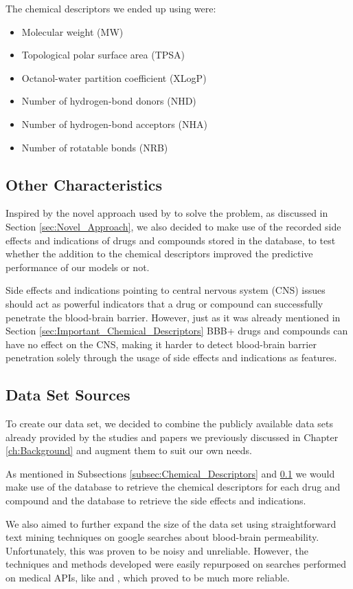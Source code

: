 The chemical descriptors we ended up using were:

\begin{itemize}
    \item
    Molecular weight (MW)
    \item
    Topological polar surface area (TPSA)
    \item
    Octanol-water partition coefficient (XLogP)
    \item
    Number of hydrogen-bond donors (NHD)
    \item
    Number of hydrogen-bond acceptors (NHA)
    \item
   Number of rotatable bonds (NRB)
\end{itemize}

\subsection{Other Characteristics}
\label{subsec:Other_Characteristics}

Inspired by the novel approach used by \citet{Gao2017} to solve the problem, as discussed in Section \ref{sec:Novel_Approach}, we also decided to make use of the recorded side effects and indications of drugs and compounds stored in the \citet{SIDER} database, to test whether the addition to the chemical descriptors improved the predictive performance of our models or not.

Side effects and indications pointing to central nervous system (CNS) issues should act as powerful indicators that a drug or compound can successfully penetrate the blood-brain barrier. However, just as it was already mentioned in Section \ref{sec:Important_Chemical_Descriptors} BBB+ drugs and compounds can have no effect on the CNS, making it harder to detect blood-brain barrier penetration solely through the usage of side effects and indications as features. 

\subsection{Data Set Sources}

To create our data set, we decided to combine the publicly available data sets already provided by the studies and papers we previously discussed in Chapter \ref{ch:Background} and augment them to suit our own needs. 

As mentioned in Subsections \ref{subsec:Chemical_Descriptors} and \ref{subsec:Other_Characteristics} we would make use of the \citet{PubChem} database to retrieve the chemical descriptors for each drug and compound and the \citet{SIDER} database to retrieve the side effects and indications.

We also aimed to further expand the size of the data set using straightforward text mining techniques on google searches about blood-brain permeability. Unfortunately, this was proven to be noisy and unreliable. However, the techniques and methods developed were easily repurposed on searches performed on medical APIs, like \citet{PubMedAPI} and \citet{SpringerAPI}, which proved to be much more reliable.


